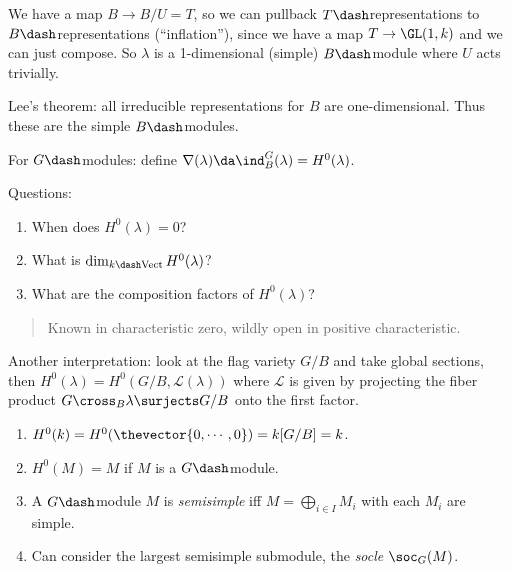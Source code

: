 We have a map \(B \to B/U = T\), so we can pullback
\(T\dash\)representations to \(B\dash\)representations (``inflation''),
since we have a map \(T\to \GL(1, k)\) and we can just compose. So
\(\lambda\) is a 1-dimensional (simple) \(B\dash\)module where \(U\)
acts trivially.

Lee's theorem: all irreducible representations for \(B\) are
one-dimensional. Thus these are the simple \(B\dash\)modules.

For \(G\dash\)modules: define
\(\nabla(\lambda) \da \ind_B^G(\lambda) = H^0(\lambda)\).

Questions:

\begin{enumerate}
\def\labelenumi{\arabic{enumi}.}
\tightlist
\item
  When does \(H^0(\lambda) = 0\)?
\item
  What is \(\dim_{k\dash\text{Vect}} H^0(\lambda)\)?
\item
  What are the composition factors of \(H^0(\lambda)\)?
\end{enumerate}

\begin{quote}
Known in characteristic zero, wildly open in positive characteristic.
\end{quote}

\begin{remark}

Another interpretation: look at the flag variety \(G/B\) and take global
sections, then \(H^0(\lambda) = H^0(G/B, \mathcal{L}(\lambda))\) where
\(\mathcal{L}\) is given by projecting the fiber product
\(G \cross_B \lambda \surjects G/B\) onto the first factor.

\end{remark}

\begin{remark}

\hfill

\begin{enumerate}
\def\labelenumi{\arabic{enumi}.}
\tightlist
\item
  \(H^0(k) = H^0(\thevector{0, \cdots, 0}) = k[G/B] = k\).
\item
  \(H^0(M) = M\) if \(M\) is a \(G\dash\)module.
\item
  A \(G\dash\)module \(M\) is \emph{semisimple} iff
  \(M = \bigoplus_{i\in I} M_i\) with each \(M_i\) are simple.
\item
  Can consider the largest semisimple submodule, the \emph{socle}
  \(\soc_G(M)\).
\end{enumerate}

\end{remark}

